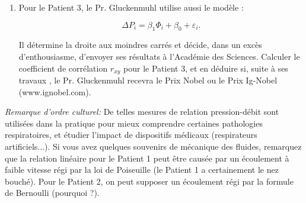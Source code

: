 \begin{exercice}
\begin{enumerate}
\item Pour le Patient 3, le Pr. Gluckenmuhl utilise aussi le mod\`ele :

\[
\Delta P_i = \beta_1 \Phi_i + \beta_0 + \varepsilon_i.
\]

Il d\'etermine la droite aux moindres carr\'es et d\'ecide, dans un exc\`es d'enthousiasme, 
d'envoyer ses r\'esultats \`a l'Acad\'emie des Sciences. Calculer le coefficient de corr\'elation 
$r_{xy}$ pour le Patient 3, et en d\'eduire si, suite \`a ses travaux , le Pr. Gluckenmuhl recevra le Prix
Nobel ou le Prix Ig-Nobel ({\sf www.ignobel.com}).

\end{enumerate}

{\it Remarque d'ordre culturel:} De telles mesures de relation pression-d\'ebit sont utilis\'ees dans la
pratique pour mieux comprendre certaines pathologies respiratoires, et \'etudier l'impact de dispositifs
m\'edicaux (respirateurs artificiels...). Si vous avez quelques souvenirs de m\'ecanique des fluides, 
remarquez que la relation lin\'eaire pour le Patient 1 peut \^etre caus\'ee par un \'ecoulement \`a faible 
vitesse r\'egi par la loi de Poiseuille (le Patient 1 a certainement le nez bouch\'e). Pour le Patient 2,
on peut supposer un \'ecoulement r\'egi par la formule de Bernoulli (pourquoi ?).\\









\end{exercice}
